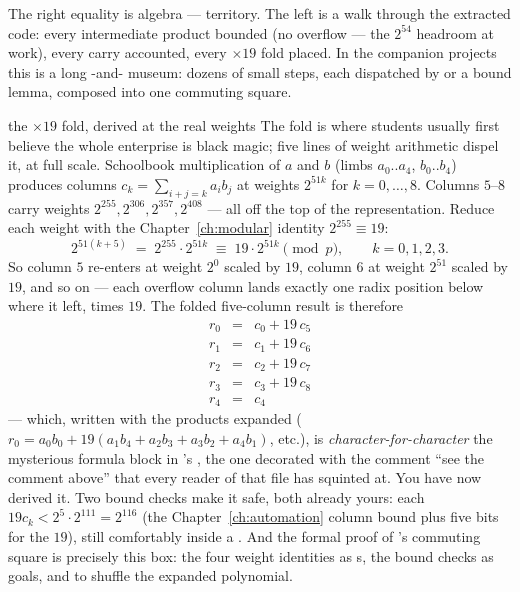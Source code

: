 The right equality is algebra ---  territory. The left is a walk
through the extracted code: every intermediate  product bounded
(no overflow --- the $2^{54}$ headroom at work), every carry accounted,
every $\times 19$ fold placed. In the companion projects this is a long
-and- museum: dozens of small steps, each dispatched
by  or a bound lemma, composed into one commuting square.

\begin{worked}{the $\times 19$ fold, derived at the real weights}
The fold is where students usually first believe the whole enterprise is
black magic; five lines of weight arithmetic dispel it, at full scale.
Schoolbook multiplication of $a$ and $b$ (limbs $a_0..a_4$, $b_0..b_4$)
produces columns $c_k = \sum_{i+j=k} a_i b_j$ at weights $2^{51k}$ for
$k = 0, \dots, 8$. Columns $5$--$8$ carry weights $2^{255}, 2^{306},
2^{357}, 2^{408}$ --- all off the top of the representation. Reduce each
weight with the Chapter~\ref{ch:modular} identity
$2^{255} \equiv 19$:
\[
2^{51(k+5)} \;=\; 2^{255} \cdot 2^{51k} \;\equiv\; 19 \cdot 2^{51k}
\pmod{p},
\qquad k = 0, 1, 2, 3 .
\]
So column $5$ re-enters at weight $2^{0}$ scaled by $19$, column $6$ at
weight $2^{51}$ scaled by $19$, and so on --- each overflow column lands
exactly one radix position below where it left, times $19$. The folded
five-column result is therefore
\[
\begin{array}{lcl}
r_0 &=& c_0 + 19\, c_5\\
r_1 &=& c_1 + 19\, c_6\\
r_2 &=& c_2 + 19\, c_7\\
r_3 &=& c_3 + 19\, c_8\\
r_4 &=& c_4
\end{array}
\]
--- which, written with the products expanded ($r_0 = a_0 b_0 +
19(a_1 b_4 + a_2 b_3 + a_3 b_2 + a_4 b_1)$, etc.), is
\emph{character-for-character} the mysterious formula block in
's , the one decorated with the comment
``see the comment above'' that every reader of that file has squinted at.
You have now derived it. Two bound checks make it safe, both already
yours: each $19 c_k < 2^{5} \cdot 2^{111} = 2^{116}$ (the
Chapter~\ref{ch:automation} column bound plus five bits for the $19$),
still comfortably inside a . And the formal proof of
's commuting square is precisely this box: the four weight
identities as s, the bound checks as  goals, and
 to shuffle the expanded polynomial.
\end{worked}

